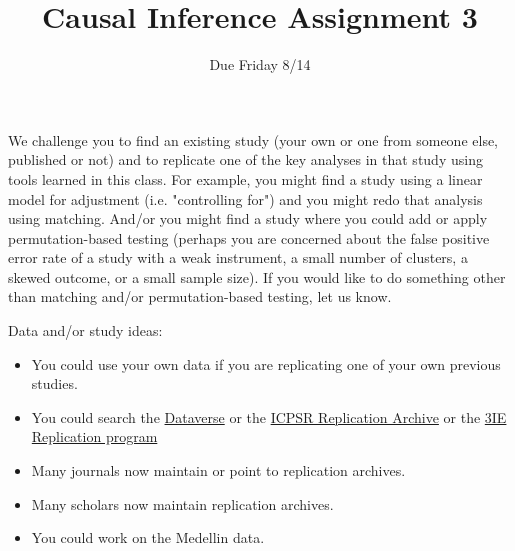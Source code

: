 \documentclass{article}
\title{Causal Inference Assignment 3}
\author{Due Friday 8/14}
\begin{document}
\maketitle

We challenge you to find an existing study (your own or one from someone else, published or not) and to replicate one of the key analyses in that study using tools learned in this class. For example, you might find a study using a linear model for adjustment (i.e. "controlling for") and you might redo that analysis using matching. And/or you might find a study where you could add or apply permutation-based testing (perhaps you are concerned about the false positive error rate of a study with a weak instrument, a small number of clusters, a skewed outcome, or a small sample size). If you would like to do something other than matching and/or permutation-based testing, let us know.

Data and/or study ideas:
\begin{itemize}
 \item You could use your own data if you are replicating one of your own previous studies.
 \item You could search the \href{http://dataverse.org/}{Dataverse} or the \href{http://www.icpsr.umich.edu/icpsrweb/deposit/pra/index.jsp}{ICPSR Replication Archive} or the \href{http://www.3ieimpact.org/evaluation/impact-evaluation-replication-programme/}{3IE Replication program}
 \item Many journals now maintain or point to replication archives.
 \item Many scholars now maintain replication archives.
 \item You could work on the Medellin data.
\end{itemize}
\end{document}
